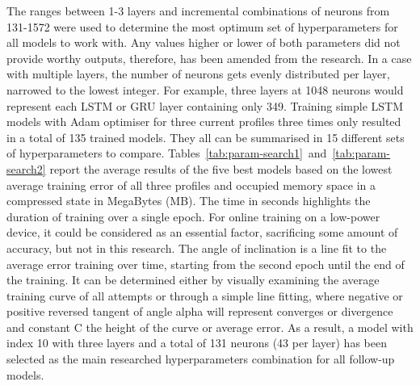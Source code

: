 %
The ranges between 1-3 layers and incremental combinations of neurons from 131-1572 were used to determine the most optimum set of hyperparameters for all models to work with.
Any values higher or lower of both parameters did not provide worthy outputs, therefore, has been amended from the research.
In a case with multiple layers, the number of neurons gets evenly distributed per layer, narrowed to the lowest integer.
For example, three layers at 1048 neurons would represent each LSTM or GRU layer containing only 349.
Training simple LSTM models with Adam optimiser for three current profiles three times only resulted in a total of 135 trained models.
They all can be summarised in 15 different sets of hyperparameters to compare.
\mbox{Tables~\ref{tab:param-search1} and~\ref{tab:param-search2}} report the average results of the five best models based on the lowest average training error of all three profiles and occupied memory space in a compressed state in MegaBytes (MB).
The time in seconds highlights the duration of training over a single epoch.
For online training on a low-power device, it could be considered as an essential factor, sacrificing some amount of accuracy, but not in this research.
The angle of inclination is a line fit to the average error training over time, starting from the second epoch until the end of the training.
It can be determined either by visually examining the average training curve of all attempts or through a simple line fitting, where negative or positive reversed tangent of angle alpha will represent converges or divergence and constant C the height of the curve or average error.
%
As a result, a model with index 10 with three layers and a total of 131 neurons (43 per layer) has been selected as the main researched hyperparameters combination for all follow-up models.
